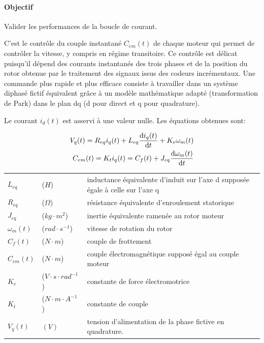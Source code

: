 \paragraph{Objectif} Valider les performances de la boucle de courant.

C'est le contrôle du couple instantané $C_{em}(t)$ de chaque moteur qui permet de contrôler la vitesse, y compris en régime transitoire. Ce contrôle est délicat puisqu'il dépend des courants instantanés des trois phases et de
la position du rotor obtenue par le traitement des signaux issus des codeurs incrémentaux. Une commande plus rapide et plus efficace consiste à travailler dans un système diphasé fictif équivalent grâce à un modèle mathématique adapté (transformation de Park) dans le plan \og dq \fg (d pour direct et q pour quadrature).

Le courant $i_d(t)$ est asservi à une valeur nulle. Les équations obtenues sont:

\begin{center}
\begin{eqnarray}
V_q(t)=R_{eq}i_q(t)+L_{eq}\dfrac{\mathrm{d} i_q(t)}{\mathrm{d} t}+K_e\omega_m(t) \label{eq3}\\
C_{em}(t)=K_ti_q(t)=C_f(t)+J_{eq}\dfrac{\mathrm{d}\omega_m(t)}{\mathrm{d} t} \label{eq4}
\end{eqnarray}
\end{center}

\begin{tabular}{l l l}
$L_{eq}$ & ($H$) & inductance équivalente d'induit sur l'axe d supposée égale à celle sur l'axe q \\
$R_{eq}$ & ($\Omega$) & résistance équivalente d'enroulement statorique \\
$J_{eq}$ & ($kg\cdot m^2$) & inertie équivalente ramenée au rotor moteur \\
$\omega_m(t)$ & ($rad\cdot s^{-1}$) & vitesse de rotation du rotor \\
$C_f(t)$ & ($N\cdot m$) & couple de frottement \\
$C_{em}(t)$  & ($N\cdot m$) & couple électromagnétique supposé égal au couple moteur \\
$K_e$ & ($V\cdot s\cdot rad^{-1}$) & constante de force électromotrice \\
$K_t$ & ($N\cdot m\cdot A^{-1}$) & constante de couple \\
$V_q (t)$ & $(V)$ & tension d'alimentation de la phase fictive en quadrature.
\end{tabular}

~\

